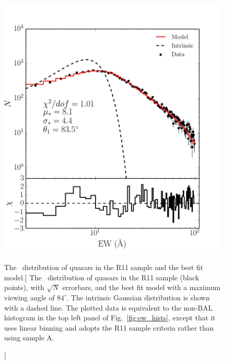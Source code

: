 \begin{figure}
\centering
\includegraphics[width=1.0\textwidth]{figures/ewpaper/quasar_fit.png}
\caption
[The \ewo\ distribution of quasars in the R11 sample and the best fit model.]
{
The \ewo\ distribution of quasars in the R11 sample (black points), 
with $\sqrt{N}$ errorbars, and the best fit model with a maximum 
viewing angle of $84^\circ$. The intrinsic Gaussian distribution
is shown with a dashed line. The plotted data is equivalent to the non-BAL histogram 
in the top left panel of Fig.~\ref{fig:ew_hists}, except that it uses linear binning
and adopts the R11 sample criteria rather than using sample A.
}
\label{fig:chi2}
\end{figure}

